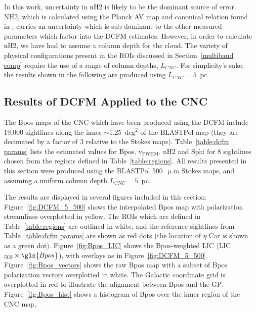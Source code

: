 In this work, uncertainty in \gls{nH2} is likely to be the dominant source of error. \gls{NH2}, which is calculated using the Planck \gls{AV} map and canonical relation found in \citet{bohlin224savage}, carries an uncertainty which is sub-dominant to the other measured parameters which factor into the DCFM estimates. However, in order to calculate \gls{nH2}, we have had to assume a column depth for the cloud. The variety of physical configurations present in the ROIs discussed in Section~\ref{multiband comp} require the use of a range of column depths, $L_{CNC}$. For simplicity's sake, the results shown in the following are produced using $L_{CNC} = 5$~pc.

\subsection{Results of DCFM Applied to the CNC}\label{Bpos estimates}

The \gls{Bpos} maps of the CNC which have been produced using the DCFM include 19,000 sightlines along the inner $\sim$1.25~deg$^{2}$ of the BLASTPol map (they are decimated by a factor of 3 relative to the Stokes maps). Table~\ref{table:dcfm params} lists the estimated values for \gls{Bpos}, v$_{\mathrm{FWHM}}$, \gls{nH2} and \gls{Sphi} for 8 sightlines chosen from the regions defined in Table~\ref{table:regions}. All results presented in this section were produced using the BLASTPol 500~$\upmu$m Stokes maps, and assuming a uniform column depth $L_{CNC} = 5$~pc.

The results are displayed in several figures included in this section: Figure~\ref{fig:DCFM_5_500} shows the interpolated \gls{Bpos} map with polarization streamlines overplotted in yellow. The ROIs which are defined in Table~\ref{table:regions} are outlined in white, and the reference sightlines from Table~\ref{table:dcfm params} are shown as red dots (the location of $\eta$ Car is shown as a green dot). Figure~\ref{fig:Bpos_LIC} shows the \gls{Bpos}-weighted LIC (LIC$_{500} \times \gls{Bpos}$), with overlays as in Figure~\ref{fig:DCFM_5_500}. Figure~\ref{fig:Bpos_vectors} shows the raw \gls{Bpos} map with a subset of \gls{Bpos} polarization vectors overplotted in white. The Galactic coordinate grid is overplotted in red to illustrate the alignment between \gls{Bpos} and the GP. Figure~\ref{fig:Bpos_hist} shows a histogram of \gls{Bpos} over the inner region of the CNC map.

